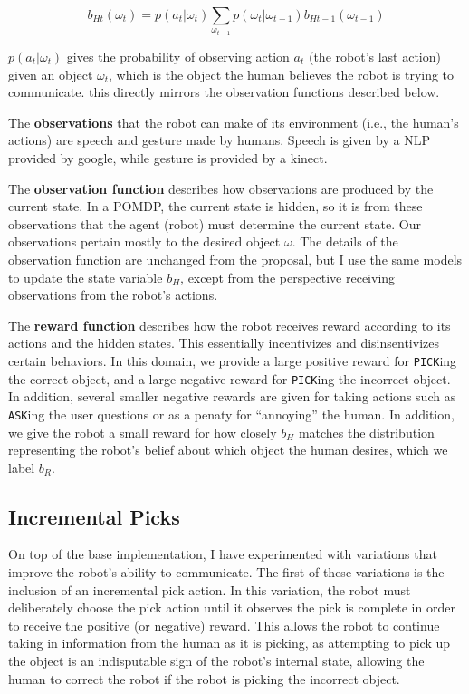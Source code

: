 \documentclass{article}
\begin{document}
$$b_{Ht}(\omega_t) = p(a_t | \omega_t) \sum_{\omega_{t-1}} p(\omega_t|\omega_{t-1}) b_{Ht-1}(\omega_{t-1})$$

$p(a_t | \omega_t)$ gives the probability of observing action $a_t$ (the robot's last action) given an object $\omega_t$, which is the object the human believes the robot is trying to communicate. this directly mirrors the observation functions described below. 

The \textbf{observations} that the robot can make of its environment (i.e., the human's actions) are speech and gesture made by humans. Speech is given by a NLP provided by google, while gesture is provided by a kinect. 

The \textbf{observation function} describes how observations are produced by the current state. In a POMDP, the current state is hidden, so it is from these observations that the agent (robot) must determine the current state. Our observations pertain mostly to the desired object $\omega$. The details of the observation function are unchanged from the proposal, but I use the same models to update the state variable $b_H$, except from the perspective receiving observations from the robot's actions. 

The \textbf{reward function} describes how the robot receives reward according to its actions and the hidden states. This essentially incentivizes and disinsentivizes certain behaviors. In this domain, we provide a large positive reward for \texttt{PICK}ing the correct object, and a large negative reward for \texttt{PICK}ing the incorrect object. In addition, several smaller negative rewards are given for taking actions such as \texttt{ASK}ing the user questions or as a penaty for ``annoying'' the human. In addition, we give the robot a small reward for how closely $b_H$ matches the distribution representing the robot's belief about which object the human desires, which we label $b_R$. 


\subsection{Incremental Picks}

On top of the base implementation, I have experimented with variations that improve the robot's ability to communicate. The first of these variations is the inclusion of an incremental pick action. In this variation, the robot must deliberately choose the pick action until it observes the pick is complete in order to receive the positive (or negative) reward. This allows the robot to continue taking in information from the human as it is picking, as attempting to pick up the object is an indisputable sign of the robot's internal state, allowing the human to correct the robot if the robot is picking the incorrect object. 
\end{document}
